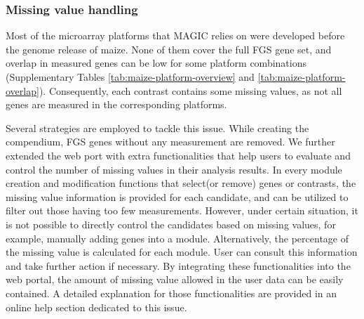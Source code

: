 \subsubsection{Missing value handling}

Most of the microarray platforms that MAGIC relies on were developed before the 
genome release of maize. 
None of them cover the full FGS gene set, and overlap in measured genes can be 
low for some platform combinations (Supplementary Tables 
\ref{tab:maize-platform-overview} and 
\ref{tab:maize-platform-overlap}).
Consequently, each contrast contains some missing values, as not all genes are 
measured in the corresponding platforms.

Several strategies are employed to tackle this issue.  While creating the 
compendium, FGS genes without any measurement are removed.  
We further extended the web port with extra functionalities that help users to 
evaluate and control the number of missing values in their analysis results.
%
In every module creation and modification functions that select(or remove) 
genes or contrasts, the missing value information is provided for each 
candidate, and can be utilized to filter out those having too few measurements.
%
However, under certain situation, it is not possible to directly control the 
candidates based on missing values, for example, manually adding genes into a 
module.
%
Alternatively, the percentage of the missing value is calculated for each 
module.
User can consult this information and take further action if necessary.
%
By integrating these functionalities into the web portal, the amount of missing 
value allowed in the user data can be easily contained.
%
A detailed explanation for those functionalities are provided in an 
online help section dedicated to this issue. 



%
%





